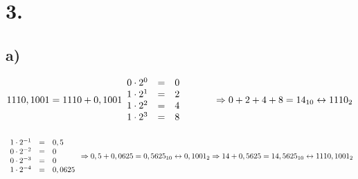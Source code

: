 \documentclass[a4paper]{scrartcl}
\begin{document}
		
	
\section{3.}
	\subsection{a)}
		\(		
		1110,1001 = 1110+0,1001 \\ \\		
		\begin{array}{rclcl}
			0\cdot 2^0 &=& 0 \\
			1\cdot 2^1 &=& 2 \\
			1\cdot 2^2 &=& 4 \\
			1\cdot 2^3 &=& 8 \\
		\end{array} 
		\quad\quad\quad\Rightarrow 0+2+4+8 = 14_{10}\leftrightarrow 1110_2 \\
		\) \\ \\
		\(
		\begin{array}{rclcl}
			1\cdot 2^{-1} &=& 0,5 \\
			0\cdot 2^{-2} &=& 0 \\
			0\cdot 2^{-3} &=& 0 \\
			1\cdot 2^{-4} &=& 0,0625 \\
		\end{array} 
		\Rightarrow 0,5+0,0625 = 0,5625_{10}\leftrightarrow 0,1001_2 \\ \\ \\
		\Rightarrow 14+0,5625 = 14,5625_{10} \leftrightarrow 1110,1001_2 \\
		\)
		
	
\end{document}
